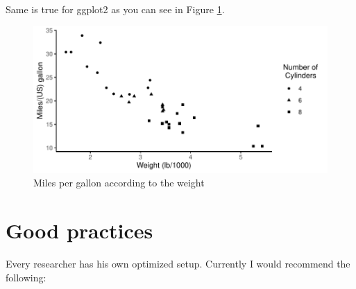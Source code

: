 \documentclass[
  12pt,
]{article}
\newenvironment{Shaded}{\begin{snugshade}}{\end{snugshade}}
\newcommand{\CharTok}[1]{\textcolor[rgb]{0.31,0.60,0.02}{#1}}
\newcommand{\CommentTok}[1]{\textcolor[rgb]{0.56,0.35,0.01}{\textit{#1}}}
\newcommand{\DataTypeTok}[1]{\textcolor[rgb]{0.13,0.29,0.53}{#1}}
\newcommand{\KeywordTok}[1]{\textcolor[rgb]{0.13,0.29,0.53}{\textbf{#1}}}
\newcommand{\NormalTok}[1]{#1}
\newcommand{\OperatorTok}[1]{\textcolor[rgb]{0.81,0.36,0.00}{\textbf{#1}}}
\newcommand{\StringTok}[1]{\textcolor[rgb]{0.31,0.60,0.02}{#1}}
\begin{document}
Same is true for ggplot2 as you can see in Figure \ref{fig:fig-2}.

\begin{Shaded}
\end{Shaded}

\begin{figure}[H]

{\centering \includegraphics{paper_files/figure-latex/fig-2-1} 

}

\caption{Miles per gallon according to the weight}\label{fig:fig-2}
\end{figure}

\hypertarget{good-practices}{%
\section{Good practices}\label{good-practices}}

Every researcher has his own optimized setup. Currently I would recommend the following:
\end{document}
